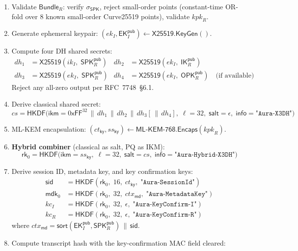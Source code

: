 \documentclass[11pt,a4paper]{article}
\theoremstyle{definition}
\theoremstyle{remark}
\newcommand{\HKDF}{\mathsf{HKDF}}
\renewcommand{\DH}{\mathsf{X25519}}
\newcommand{\KEM}{\mathsf{ML\text{-}KEM\text{-}768}}
\newcommand{\KeyGen}{\mathsf{KeyGen}}
\newcommand{\Encaps}{\mathsf{Encaps}}
\newcommand{\IK}{\mathsf{IK}}
\newcommand{\SPK}{\mathsf{SPK}}
\newcommand{\EK}{\mathsf{EK}}
\newcommand{\OPK}{\mathsf{OPK}}
\newcommand{\rk}{\mathsf{rk}}
\newcommand{\mdk}{\mathsf{mdk}}
\newcommand{\sid}{\mathsf{sid}}
\newcommand{\concat}{\,\|\,}
\begin{document}
\begin{enumerate}[nosep]
  \item Validate $\mathsf{Bundle}_R$: verify $\sigma_{\SPK}$, reject small-order points
        (constant-time OR-fold over 8 known small-order Curve25519 points),
        validate $\mathit{kpk}_R$.
  \item Generate ephemeral keypair: $(ek_I, \EK_I^{\mathsf{pub}}) \gets \DH.\KeyGen()$.
  \item Compute four DH shared secrets:
  \begin{align*}
    \mathit{dh}_1 &= \DH(ik_I,\; \SPK_R^{\mathsf{pub}}) &
    \mathit{dh}_2 &= \DH(ek_I,\; \IK_R^{\mathsf{pub}}) \\
    \mathit{dh}_3 &= \DH(ek_I,\; \SPK_R^{\mathsf{pub}}) &
    \mathit{dh}_4 &= \DH(ek_I,\; \OPK_R^{\mathsf{pub}}) \quad\text{(if available)}
  \end{align*}
  Reject any all-zero output per RFC~7748~\S6.1.
  \item Derive classical shared secret:
  \[
    \mathit{cs} = \HKDF\bigl(\mathsf{ikm} = 0\mathsf{xFF}^{32} \concat
      \mathit{dh}_1 \concat \mathit{dh}_2 \concat \mathit{dh}_3
      [\concat \mathit{dh}_4],\;
      \ell = 32,\; \mathsf{salt} = \epsilon,\;
      \mathsf{info} = \texttt{"Aura-X3DH"}\bigr)
  \]
  \item ML-KEM encapsulation:
  $(\mathit{ct}_{\mathsf{ky}}, \mathit{ss}_{\mathsf{ky}}) \gets \KEM.\Encaps(\mathit{kpk}_R)$.
  \item \textbf{Hybrid combiner} (classical as salt, PQ as IKM):
  \[
    \rk_0 = \HKDF\bigl(\mathsf{ikm} = \mathit{ss}_{\mathsf{ky}},\;
      \ell = 32,\;
      \mathsf{salt} = \mathit{cs},\;
      \mathsf{info} = \texttt{"Aura-Hybrid-X3DH"}\bigr)
  \]
  \item Derive session ID, metadata key, and key confirmation keys:
  \begin{align*}
    \sid &= \HKDF(\rk_0,\; 16,\; \mathit{ct}_{\mathsf{ky}},\; \texttt{"Aura-SessionId"}) \\
    \mdk_0 &= \HKDF(\rk_0,\; 32,\; \mathit{ctx}_{\mathsf{md}},\; \texttt{"Aura-MetadataKey"}) \\
    \mathit{kc}_I &= \HKDF(\rk_0,\; 32,\; \epsilon,\; \texttt{"Aura-KeyConfirm-I"}) \\
    \mathit{kc}_R &= \HKDF(\rk_0,\; 32,\; \epsilon,\; \texttt{"Aura-KeyConfirm-R"})
  \end{align*}
  where $\mathit{ctx}_{\mathsf{md}} = \mathsf{sort}(\EK_I^{\mathsf{pub}}, \SPK_R^{\mathsf{pub}}) \concat \sid$.
  \item Compute transcript hash with the key-confirmation MAC field cleared:

\end{enumerate}
\end{document}
